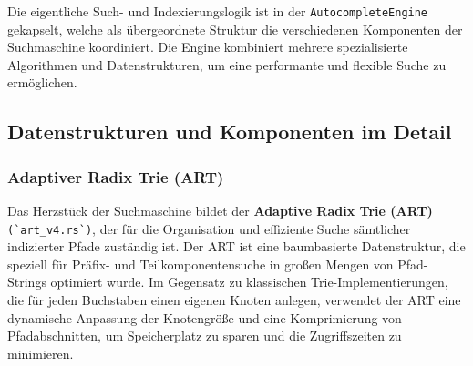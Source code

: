 Die eigentliche Such- und Indexierungslogik ist in der \verb|AutocompleteEngine| gekapselt, welche als übergeordnete Struktur die verschiedenen Komponenten der Suchmaschine koordiniert. Die Engine kombiniert mehrere spezialisierte Algorithmen und Datenstrukturen, um eine performante und flexible Suche zu ermöglichen.

\subsection{Datenstrukturen und Komponenten im Detail}

\subsubsection{Adaptiver Radix Trie (ART)}
Das Herzstück der Suchmaschine bildet der \textbf{Adaptive Radix Trie (ART)} \verb|(`art_v4.rs`)|, der für die Organisation und effiziente Suche sämtlicher indizierter Pfade zuständig ist. Der ART ist eine baumbasierte Datenstruktur, die speziell für Präfix- und Teilkomponentensuche in großen Mengen von Pfad-Strings optimiert wurde. Im Gegensatz zu klassischen Trie-Implementierungen, die für jeden Buchstaben einen eigenen Knoten anlegen, verwendet der ART eine dynamische Anpassung der Knotengröße und eine Komprimierung von Pfadabschnitten, um Speicherplatz zu sparen und die Zugriffszeiten zu minimieren.


